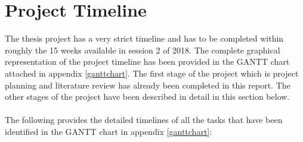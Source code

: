 \documentclass[a4paper,twoside,phd]{BYUPhys}
\begin{document}
\section{Project Timeline}
The thesis project has a very strict timeline and has to be completed within roughly the 15 weeks available in session 2 of 2018. The complete graphical representation of the project timeline has been provided in the GANTT chart attached in appendix \ref{ganttchart}. The first stage of the project which is project planning and literature review has already been completed in this report. The other stages of the project have been described in detail in this section below.
\\
\\
The following provides the detailed timelines of all the tasks that have been identified in the GANTT chart in appendix \ref{ganttchart}:
\end{document}
